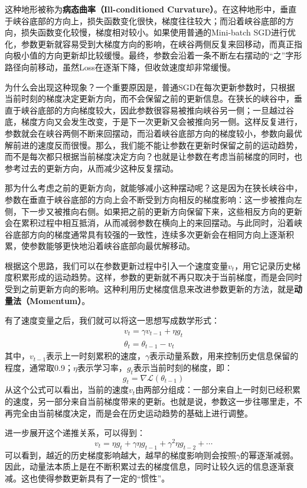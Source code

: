这种地形被称为\textbf{病态曲率（Ill-conditioned Curvature）}。在这种地形中，垂直于峡谷底部的方向上，损失函数变化很快，梯度往往较大；而沿着峡谷底部的方向，损失函数变化较慢，梯度相对较小。如果使用普通的Mini-batch SGD进行优化，参数更新就容易受到大梯度方向的影响，在峡谷两侧反复来回移动，而真正指向极小值的方向更新却比较缓慢。最终，参数会沿着一条不断左右摆动的“之”字形路径向前移动，虽然Loss在逐渐下降，但收敛速度却非常缓慢。

为什么会出现这种现象？一个重要原因是，普通SGD在每次更新参数时，只根据当前时刻的梯度决定更新方向，而不会保留之前的更新信息。在狭长的峡谷中，垂直于峡谷底部的方向梯度较大，因此参数很容易被推向峡谷另一侧；一旦越过谷底，梯度方向又会发生改变，于是下一次更新又会被推向另一侧。这样反复进行，参数就会在峡谷两侧不断来回摆动，而沿着峡谷底部方向的梯度较小，参数向最优解前进的速度反而很慢。那么，我们能不能让参数在更新时保留之前的运动趋势，而不是每次都只根据当前梯度决定方向？也就是让参数在考虑当前梯度的同时，也参考过去的更新方向，从而减少这种反复摆动。

那为什么考虑之前的更新方向，就能够减小这种摆动呢？这是因为在狭长峡谷中，参数在垂直于峡谷底部的方向上会不断受到方向相反的梯度影响：这一步被推向左侧，下一步又被推向右侧。如果把之前的更新方向保留下来，这些相反方向的更新会在累积过程中相互抵消，从而减弱参数在横向上的来回摆动。与此同时，沿着峡谷底部方向的梯度通常具有较强的一致性，连续多次更新会在相同方向上逐渐积累，使参数能够更快地沿着峡谷底部向最优解移动。

根据这个思路，我们可以在参数更新过程中引入一个速度变量$v_t$，用它记录历史梯度积累形成的运动趋势。这样，参数的更新就不再只取决于当前梯度，而是会同时受到之前更新方向的影响。这种利用历史梯度信息来改进参数更新的方法，就是\textbf{动量法（Momentum）}。

有了速度变量之后，我们就可以将这一思想写成数学形式：
$$
\begin{gathered}
v_t = \gamma v_{t-1} + \eta g_t \\
\theta_t = \theta_{t-1} - v_t
\end{gathered}
$$
其中，$v_{t-1}$表示上一时刻累积的速度，$\gamma$表示动量系数，用来控制历史信息保留的程度，通常取0.9；$\eta$表示学习率，$g_t$表示当前时刻的梯度，即：
$$
g_t=\nabla\mathcal{L}(\theta_{t-1})
$$
从这个公式可以看出，当前的速度$v_t$由两部分组成：一部分来自上一时刻已经积累的速度，另一部分来自当前梯度带来的更新。也就是说，参数这一步往哪里走，不再完全由当前梯度决定，而是会在历史运动趋势的基础上进行调整。

进一步展开这个递推关系，可以得到：
$$
v_t = \eta g_t + \gamma\eta g_{t-1} + \gamma^2\eta g_{t-2} + \cdots
$$
可以看到，越近的历史梯度影响越大，越早的梯度影响则会按照$\gamma$的幂逐渐减弱。因此，动量法本质上是在不断积累过去的梯度信息，同时让较久远的信息逐渐衰减。这也使得参数更新具有了一定的“惯性”。

